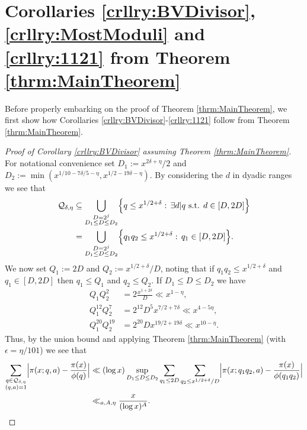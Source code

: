 \documentclass[10pt]{amsart}
\theoremstyle{plain}
\numberwithin{equation}{section}
\begin{document}
\section{Corollaries \ref{crllry:BVDivisor}, \ref{crllry:MostModuli} and \ref{crllry:1121} from Theorem \ref{thrm:MainTheorem}}
%
%
%
%
Before properly embarking on the proof of Theorem \ref{thrm:MainTheorem}, we first show how Corollaries \ref{crllry:BVDivisor}-\ref{crllry:1121} follow from Theorem \ref{thrm:MainTheorem}.
%
%
%
%
%
%
%
%
\begin{proof}[Proof of Corollary \ref{crllry:BVDivisor} assuming Theorem \ref{thrm:MainTheorem}]
For notational convenience set $D_1:=x^{2\delta+\eta}/2$ and $D_2:=\min(x^{1/10-7\delta/5-\eta},x^{1/2-19\delta-\eta})$. By considering the $d$ in dyadic ranges we see that
\begin{align*}
\mathcal{Q}_{\delta,\eta}&\subseteq \bigcup_{\substack{D=2^j\\ D_1\le D\le D_2}}\Bigl\{q\le x^{1/2+\delta}:\,\exists d|q \text{ s.t. }d\in[D,2D]\Bigr\}\\
&=\bigcup_{\substack{D=2^j\\ D_1\le D\le D_2}}\Bigl\{q_1q_2\le x^{1/2+\delta}:\,q_1\in[D,2D]\Bigr\}.
\end{align*}
We now set $Q_1:=2D$ and $Q_2:=x^{1/2+\delta}/D$, noting that if $q_1q_2\le  x^{1/2+\delta}$ and $q_1\in[D,2D]$ then $q_1\le Q_1$ and $q_2\le Q_2$. If $D_1\le D \le D_2$ we have
\begin{align*}
Q_1Q_2^2&=2\frac{x^{1+2\delta}}{D}\ll x^{1-\eta},\\
Q_1^{12}Q_2^7&=2^{12}D^5 x^{7/2+7\delta}\ll x^{4-5\eta},\\
Q_1^{20}Q_2^{19}&=2^{20}D x^{19/2+19\delta}\ll x^{10-\eta}.
\end{align*}
Thus, by the union bound and applying Theorem \ref{thrm:MainTheorem} (with $\epsilon=\eta/101$) we see that
\begin{align*}
\sum_{\substack{q\in \mathcal{Q}_{\delta,\eta}\\ (q,a)=1}}\Bigl|\pi(x;q,a)-\frac{\pi(x)}{\phi(q)}\Bigr|&\ll (\log{x})\sup_{D_1\le D\le D_2}\sum_{q_1\le 2D}\sum_{q_2\le  x^{1/2+\delta}/D}\Bigl|\pi(x;q_1q_2,a)-\frac{\pi(x)}{\phi(q_1q_2)}\Bigr|\\
&\ll_{a, A,\eta} \frac{x}{(\log{x})^A}.\qedhere
\end{align*}
\end{proof}
%
%
%
%
%
%
\end{document}
